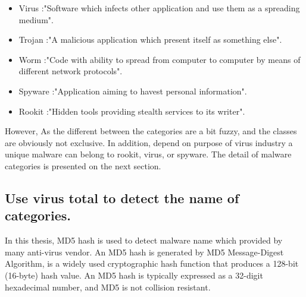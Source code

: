 \begin{itemize}
\item Virus :"Software which infects other application and use them as a spreading medium"\cite{BlackHat}.
\item Trojan :"A malicious application which present itself as something else"\cite{BlackHat}.
\item Worm :"Code with ability to spread from computer to computer by means of different network protocols"\cite{BlackHat}.
\item Spyware :"Application aiming to havest personal information"\cite{BlackHat}.
\item Rookit :"Hidden tools providing stealth services to its writer"\cite{BlackHat}.
\end{itemize}

However, As the different between the categories are a bit fuzzy, and the classes are obviously not exclusive. In addition, depend on purpose of virus industry a unique malware can belong to rookit, virus, or spyware. The detail of malware categories is presented on the next section. 
\subsection{Use virus total to detect the name of categories.}

In this thesis, MD5 hash is used to detect malware name which provided by many anti-virus vendor. An MD5 hash is generated by MD5 Message-Digest Algorithm, is a widely used cryptographic hash function that produces a 128-bit (16-byte) hash value. An MD5 hash is typically expressed as a 32-digit hexadecimal number, and MD5 is not collision resistant\cite{wiki1}.

